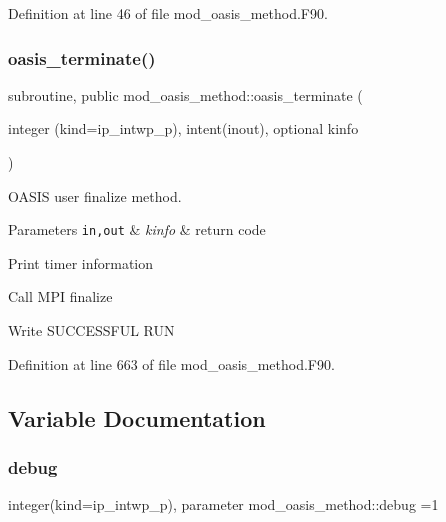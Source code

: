 Definition at line 46 of file mod\+\_\+oasis\+\_\+method.\+F90.

\mbox{\label{namespacemod__oasis__method_a4fb881336906c9452b6a9f250af9c3d7}} 
\subsubsection{\texorpdfstring{oasis\+\_\+terminate()}{oasis\_terminate()}}
{\footnotesize\ttfamily subroutine, public mod\+\_\+oasis\+\_\+method\+::oasis\+\_\+terminate (\begin{DoxyParamCaption}\item[{integer (kind=ip\+\_\+intwp\+\_\+p), intent(inout), optional}]{kinfo }\end{DoxyParamCaption})}



O\+A\+S\+IS user finalize method. 


\begin{DoxyParams}[1]{Parameters}
\mbox{\tt in,out}  & {\em kinfo} & return code \\
\hline
\end{DoxyParams}

\begin{DoxyItemize}
\item Print timer information
\item Call M\+PI finalize
\item Write S\+U\+C\+C\+E\+S\+S\+F\+UL R\+UN 
\end{DoxyItemize}

Definition at line 663 of file mod\+\_\+oasis\+\_\+method.\+F90.



\subsection{Variable Documentation}
\mbox{\label{namespacemod__oasis__method_a390290b92b6af57b2732cb7521532f1c}} 
\subsubsection{\texorpdfstring{debug}{debug}}
{\footnotesize\ttfamily integer(kind=ip\+\_\+intwp\+\_\+p), parameter mod\+\_\+oasis\+\_\+method\+::debug =1\hspace{0.3cm}{\ttfamily [private]}}



